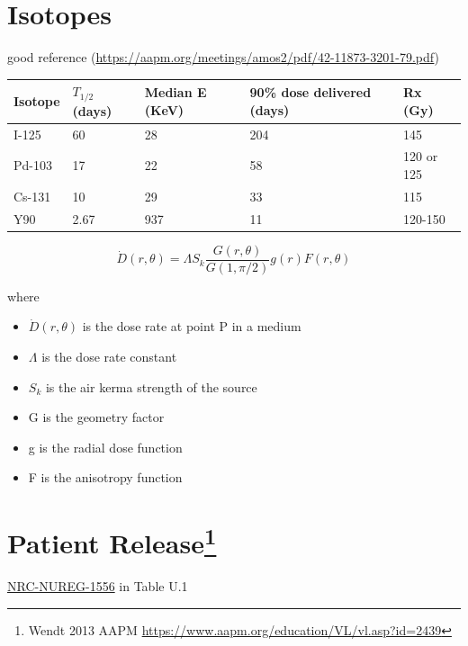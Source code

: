 \documentclass[]{book}
\providecommand{\tightlist}{%
  \setlength{\itemsep}{0pt}\setlength{\parskip}{0pt}}
\let\rmarkdownfootnote\footnote%
\def\footnote{\protect\rmarkdownfootnote}
\theoremstyle{definition}
\theoremstyle{definition}
\theoremstyle{definition}
\theoremstyle{remark}
\begin{document}
\section{Isotopes}\label{isotopes-1}

good reference
(\url{https://aapm.org/meetings/amos2/pdf/42-11873-3201-79.pdf})

\begin{longtable}[]{@{}lllll@{}}
\toprule
Isotope & \(T_{1/2}\) (days) & Median E (KeV) & 90\% dose delivered
(days) & Rx (Gy)\tabularnewline
\midrule
\endhead
I-125 & 60 & 28 & 204 & 145\tabularnewline
Pd-103 & 17 & 22 & 58 & 120 or 125\tabularnewline
Cs-131 & 10 & 29 & 33 & 115\tabularnewline
Y90 & 2.67 & 937 & 11 & 120-150\tabularnewline
\bottomrule
\end{longtable}

\begin{equation}
  \dot D(r, \theta) = \Lambda S_k \frac{G(r,\theta)}{G(1,\pi/2)} g(r) F(r,\theta)
\end{equation}

where

\begin{itemize}
\tightlist
\item
  \(\dot D(r,\theta)\) is the dose rate at point P in a medium
\item
  \(\Lambda\) is the dose rate constant
\item
  \(S_k\) is the air kerma strength of the source
\item
  G is the geometry factor
\item
  g is the radial dose function
\item
  F is the anisotropy function
\end{itemize}

\section[Patient Release]{\texorpdfstring{Patient Release\footnote{Wendt
  2013 AAPM \url{https://www.aapm.org/education/VL/vl.asp?id=2439}}}{Patient Release}}\label{patient-release}

\href{https://www.nrc.gov/reading-rm/doc-collections/nuregs/staff/sr1556/}{NRC-NUREG-1556}
in Table U.1
\end{document}
